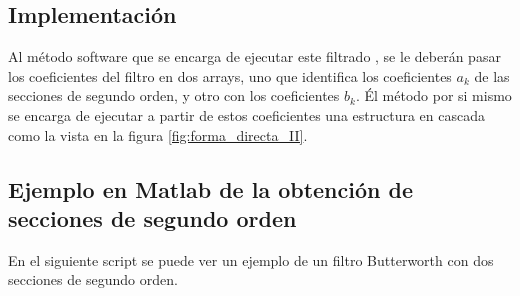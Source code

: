 \documentclass[titlepage]{article}
\begin{document}
\subsection{Implementación}
Al método software que se encarga de ejecutar este filtrado , se le deberán pasar los coeficientes del filtro en dos arrays, uno que identifica los coeficientes $a_{k}$ de las secciones de segundo orden, y otro con los coeficientes $b_k$. Él método por si mismo se encarga de ejecutar a partir de estos coeficientes una estructura en cascada como la vista en la figura \ref{fig:forma_directa_II}.

\subsection{Ejemplo en Matlab de la obtención de secciones de segundo orden}
En el siguiente script se puede ver un ejemplo de un filtro Butterworth con dos secciones de segundo orden. 

\end{document}
